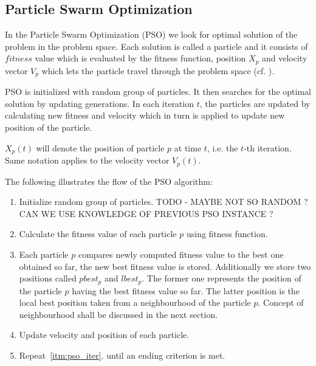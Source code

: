 \documentclass[runningheads,a4paper]{llncs}
\begin{document}
\subsection{Particle Swarm Optimization}
In the Particle Swarm Optimization (PSO) we look for optimal solution of the problem in the problem space. Each solution is called a particle and it consists of $fitness$ value which is evaluated by the fitness function, position $X_p$ and velocity vector $V_p$ which lets the particle travel through the problem space (cf. \cite{pso_origin}).

PSO is initialized with random group of particles. It then searches for the optimal solution by updating generations.
In each iteration $t$, the particles are updated by calculating new fitness and velocity which in turn is applied to update new position of the particle.

$X_p(t)$ will denote the position of particle $p$ at time $t$, i.e. the $t$-th iteration. Same notation applies to the velocity vector $V_p(t)$.

The following illustrates the flow of the PSO algorithm:

\begin{center}

\begin{enumerate}
	\item Initialize random group of particles. {\color{red} TODO - MAYBE NOT SO RANDOM ? CAN WE USE KNOWLEDGE OF PREVIOUS PSO INSTANCE ?}
	\item \label{itm:pso_iter} Calculate the fitness value of each particle $p$ using fitness function.
		
	\item Each particle $p$ compares newly computed fitness value to the best one obtained so far, the new best fitness value is stored. Additionally we store two positions called $pbest_p$ and $lbest_p$. The former one represents the position of the particle $p$ having the best fitness value so far. The latter position is the local best position taken from a neighbourhood of the particle $p$. Concept of neighbourhood shall be discussed in the next section.
	
	\item Update velocity and position of each particle.
	
	\item Repeat~\ref{itm:pso_iter}. until an ending criterion is met.
	
\end{enumerate}

\end{center}
\end{document}
